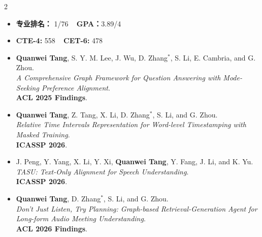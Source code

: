\documentclass[10pt,a4paper,withhyper,normalphoto]{altacv}
\begin{document}
\begin{paracol}{2}
\switchcolumn



\divider

  
\begin{itemize}
\item \textbf{专业排名：} 1/76 ~ \textbf{GPA：}3.89/4
\item \textbf{CTE-4:} 558 ~ \textbf{CET-6:} 478   
\end{itemize}


\begin{itemize}
    \item \textbf{Quanwei Tang}, S. Y. M. Lee, J. Wu, D. Zhang$^*$, S. Li, E. Cambria, and G. Zhou. \\
    \textit{A Comprehensive Graph Framework for Question Answering with Mode-Seeking Preference Alignment}. \\
    \textbf{ACL 2025 Findings}.
\end{itemize}
\begin{itemize}
    \item \textbf{Quanwei Tang}, Z. Tang, X. Li, D. Zhang$^*$, S. Li, and G. Zhou. \\
    \textit{Relative Time Intervals Representation for Word-level Timestamping with Masked Training}. \\
    \textbf{ICASSP 2026}.
\end{itemize}
\begin{itemize}
    \item J. Peng, Y. Yang, X. Li, Y. Xi, \textbf{Quanwei Tang},  Y. Fang, J. Li, and K. Yu. \\
    \textit{TASU: Text-Only Alignment for Speech Understanding}. \\
    \textbf{ICASSP 2026}.
\end{itemize}
\begin{itemize}
    \item \textbf{Quanwei Tang}, D. Zhang$^*$, S. Li, and G. Zhou. \\
    \textit{Don’t Just Listen, Try Planning: Graph-based Retrieval-Generation Agent for Long-form Audio Meeting Understanding}. \\
    \textbf{ACL 2026 Findings}.
\end{itemize}





\end{paracol}
\end{document}
